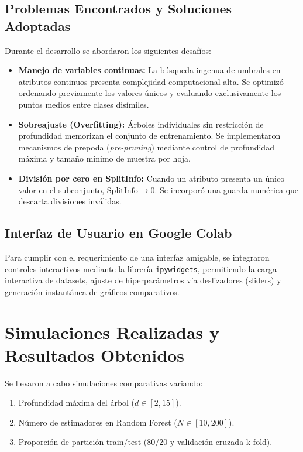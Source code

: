 \documentclass[runningheads]{llncs}
\begin{document}
\subsection{Problemas Encontrados y Soluciones Adoptadas}
Durante el desarrollo se abordaron los siguientes desafíos:
\begin{itemize}
    \item \textbf{Manejo de variables continuas:} La búsqueda ingenua de umbrales en atributos continuos presenta complejidad computacional alta. Se optimizó ordenando previamente los valores únicos y evaluando exclusivamente los puntos medios entre clases disímiles.
    \item \textbf{Sobreajuste (Overfitting):} Árboles individuales sin restricción de profundidad memorizan el conjunto de entrenamiento. Se implementaron mecanismos de prepoda (\textit{pre-pruning}) mediante control de profundidad máxima y tamaño mínimo de muestra por hoja.
    \item \textbf{División por cero en SplitInfo:} Cuando un atributo presenta un único valor en el subconjunto, $\text{SplitInfo} \to 0$. Se incorporó una guarda numérica que descarta divisiones inválidas.
\end{itemize}

\subsection{Interfaz de Usuario en Google Colab}
Para cumplir con el requerimiento de una interfaz amigable, se integraron controles interactivos mediante la librería \texttt{ipywidgets}, permitiendo la carga interactiva de datasets, ajuste de hiperparámetros vía deslizadores (sliders) y generación instantánea de gráficos comparativos.

\section{Simulaciones Realizadas y Resultados Obtenidos}
Se llevaron a cabo simulaciones comparativas variando:
\begin{enumerate}
    \item Profundidad máxima del árbol ($d \in [2, 15]$).
    \item Número de estimadores en Random Forest ($N \in [10, 200]$).
    \item Proporción de partición train/test (80/20 y validación cruzada k-fold).
\end{enumerate}
\end{document}
